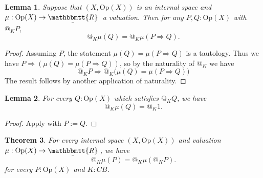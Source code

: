 \documentclass[11pt, oneside, article]{memoir}
\makeatletter
\theoremstyle{plain}
\newtheorem{theorem}{Theorem}[chapter] %
\newtheorem{lemma}[theorem]{Lemma}
\theoremstyle{definition}
\theoremstyle{remark}
\newcommand{\Set}[1]{\mathrm{#1}}
\newcommand{\ubar}[1]{\underaccent{\bar}{#1}}
\newcommand{\internal}[1]{\raisebox{-.03ex}{$\mathbbmtt{#1}$}}
\newcommand{\hs}{\hspace{1.1pt}}
\newcommand{\tQQ}{\internal{Q}\hs}
\newcommand{\tRR}{\internal{R}\hs}
\newcommand{\tLR}{\ubar{\tRR}\hs}
\newcommand{\Op}{\Set{Op}}
\newcommand{\BaseSpace}{B}
\newcommand{\CB}{C\BaseSpace}
\newcommand{\AtSymbol}{{@}}
\newcommand{\At}[2][]{\AtSymbol^{#1}_{#2}}
\newcommand{\imp}{\Rightarrow}
\makeatother
\begin{document}
\begin{lemma}
	\label{lem.naturality}
	Suppose that $(X,\Op(X))$ is an internal space and $\mu : \Op(X) \to \tLR$ a valuation. Then for any $P, Q : \Op(X)$ with $\At{K} P$,
	\[
		\At{K} \mu(Q) = \At{K} \mu(P \imp Q).
	\]
\end{lemma}

\begin{proof}
  Assuming $P$, the statement $\mu(Q)=\mu(P\imp Q)$ is a tautology. Thus we have $P\imp(\mu(Q)=\mu(P\imp Q))$, so by the naturality of $\At{K}$ we have
  \[\At{K}P\imp\At{K}\big(\mu(Q)=\mu(P\imp Q)\big)\]
  The result follows by another application of naturality.
\end{proof}

\begin{lemma}
	\label{lem.mu_at_Q}
	For every $Q : \Op(X)$ which satisfies $\At{K} Q$, we have
	\[
		\At{K} \mu(Q) = \At{K} 1.
	\]
\end{lemma}

\begin{proof}
	Apply  with $P := Q$.
\end{proof}

\begin{theorem}
	For every internal space $(X,\Op(X))$ and valuation $\mu : \Op(X) \to \tLR$, we have
	\[
		\At{K} \mu(P) = \At{K} \mu(\At{K} P).
	\]
	for every $P : \Op(X)$ and $K : \CB$.
\end{theorem}
\end{document}
